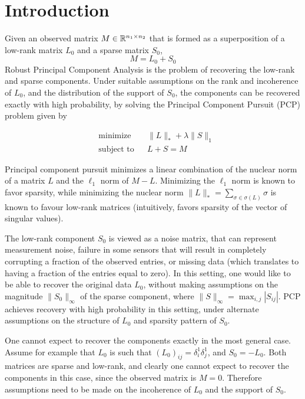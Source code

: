 
\section{Introduction}
Given an observed matrix $M \in {\mathbb R}^{n_1 \times n_2}$ that is formed as a superposition of a low-rank matrix $L_0$ and a sparse matrix $S_0$,
\[
M = L_0 + S_0
\]
Robust Principal Component Analysis \cite{Candes:2011fk} is the problem of recovering the low-rank and sparse components. Under suitable assumptions on the rank and incoherence of $L_0$, and the distribution of the support of $S_0$, the components can be recovered exactly with high probability, by solving the Principal Component Pursuit (PCP) problem given by

\begin{equation}
\begin{aligned}
&\text{minimize} && \|L\|_* + \lambda \|S\|_1 \\
&\text{subject to} && L+S = M
\label{eq:pcp}
\end{aligned}
\end{equation}

Principal component pursuit minimizes a linear combination of the nuclear norm of a matrix $L$ and the $\ell_1$ norm of $M-L$. Minimizing the $\ell_1$ norm is known to favor sparsity, while minimizing the nuclear norm $\|L\|_* = \sum_{\sigma \in \sigma(L)} \sigma$ is known to favour low-rank matrices (intuitively, favors sparsity of the vector of singular values).

The low-rank component $S_0$ is viewed as a noise matrix, that can represent measurement noise, failure in some sensors that will result in completely corrupting a fraction of the observed entries, or missing data (which translates to having a fraction of the entries equal to zero). In this setting, one would like to be able to recover the original data $L_0$, without making assumptions on the magnitude $\|S_0\|_\infty$ of the sparse component, where $\|S\|_\infty = \max_{i,j} |S_{ij}|$. PCP achieves recovery with high probability in this setting, under alternate assumptions on the structure of $L_0$ and sparsity pattern of $S_0$.

One cannot expect to recover the components exactly in the most general case. Assume for example that $L_0$ is such that $(L_0)_{ij} = \delta_i^1\delta_j^1$, and $S_0 = -L_0$. Both matrices are sparse and low-rank, and clearly one cannot expect to recover the components in this case, since the observed matrix is $M = 0$. Therefore assumptions need to be made on the incoherence of $L_0$ and the support of $S_0$.


